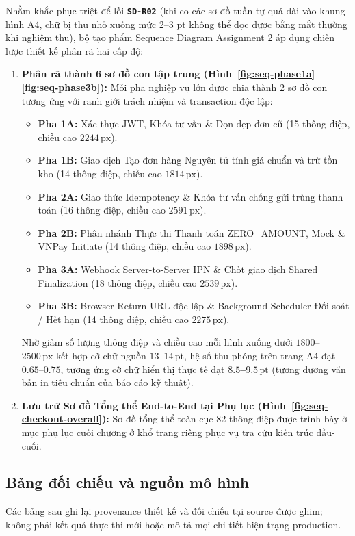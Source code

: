 Nhằm khắc phục triệt để lỗi \textbf{\texttt{SD-R02}} (khi co các sơ đồ tuần tự quá dài vào khung hình A4, chữ bị thu nhỏ xuống mức 2--3 pt không thể đọc được bằng mắt thường khi nghiệm thu), bộ tạo phẩm Sequence Diagram Assignment 2 áp dụng chiến lược thiết kế phân rã hai cấp độ:
\begin{enumerate}
  \item \textbf{Phân rã thành 6 sơ đồ con tập trung (Hình~\ref{fig:seq-phase1a}--\ref{fig:seq-phase3b}):} Mỗi pha nghiệp vụ lớn được chia thành 2 sơ đồ con tương ứng với ranh giới trách nhiệm và transaction độc lập:
  \begin{itemize}
    \item \textbf{Pha 1A:} Xác thực JWT, Khóa tư vấn \& Dọn dẹp đơn cũ (15 thông điệp, chiều cao $2244\,\text{px}$).
    \item \textbf{Pha 1B:} Giao dịch Tạo đơn hàng Nguyên tử tính giá chuẩn và trừ tồn kho (14 thông điệp, chiều cao $1814\,\text{px}$).
    \item \textbf{Pha 2A:} Giao thức Idempotency \& Khóa tư vấn chống gửi trùng thanh toán (16 thông điệp, chiều cao $2591\,\text{px}$).
    \item \textbf{Pha 2B:} Phân nhánh Thực thi Thanh toán ZERO\_AMOUNT, Mock \& VNPay Initiate (14 thông điệp, chiều cao $1898\,\text{px}$).
    \item \textbf{Pha 3A:} Webhook Server-to-Server IPN \& Chốt giao dịch Shared Finalization (18 thông điệp, chiều cao $2539\,\text{px}$).
    \item \textbf{Pha 3B:} Browser Return URL độc lập \& Background Scheduler Đối soát / Hết hạn (14 thông điệp, chiều cao $2275\,\text{px}$).
  \end{itemize}
  Nhờ giảm số lượng thông điệp và chiều cao mỗi hình xuống dưới $1800$--$2500\,\text{px}$ kết hợp cỡ chữ nguồn $13$--$14\,\text{pt}$, hệ số thu phóng trên trang A4 đạt $0.65$--$0.75$, tương ứng cỡ chữ hiển thị thực tế đạt \textbf{$8.5$--$9.5\,\text{pt}$} (tương đương văn bản in tiêu chuẩn của báo cáo kỹ thuật).
  \item \textbf{Lưu trữ Sơ đồ Tổng thể End-to-End tại Phụ lục (Hình~\ref{fig:seq-checkout-overall}):} Sơ đồ tổng thể toàn cục 82 thông điệp được trình bày ở mục phụ lục cuối chương ở khổ trang riêng phục vụ tra cứu kiến trúc đầu-cuối.
\end{enumerate}


\subsection{Bảng đối chiếu và nguồn mô hình}
Các bảng sau ghi lại provenance thiết kế và đối chiếu tại source được ghim;
không phải kết quả thực thi mới hoặc mô tả mọi chi tiết hiện trạng production.
